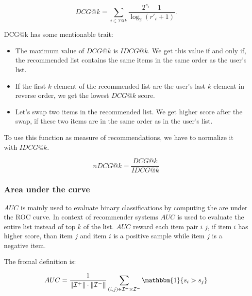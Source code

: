 $$ DCG@k=\sum_{i \in \mathcal{I}@k}\frac{2^{s_i}-1}{\log_2(r'_i+1)}.$$

DCG@k has some mentionable trait:
\begin{itemize}
\item The maximum value of $DCG@k$ is $IDCG@k$. We get this value if and only if, the
  recommended list contains the same items in the same order as the user's list.
\item If the first $k$ element of the recommended list are the user's last $k$ element in
  reverse order, we get the lowest $DCG@k$ score.
\item Let's swap two items in the recommended list. We get higher score after the
  swap, if these two items are in the same order as in the user's list.
\end{itemize}
To use this function as measure of recommendations, we have to normalize it with
$IDCG@k$.

$$nDCG@k=\frac{DCG@k}{IDCG@k}$$

\subsubsection{Area under the curve}
$AUC$ is mainly used to evaluate binary classifications by computing the are under
the ROC curve. In context of recommender systems $AUC$ is used to evaluate the
entire list instead of top $k$ of the list. $AUC$ reward each item pair $i$ $j$, if
item $i$ has higher score, than item $j$ and item $i$ is a positive sample while item
$j$ is a negative item.

The fromal definition is:

\[ AUC=\frac{1}{\|\mathcal{I}^{+}\|\cdot\|\mathcal{I}^-\|}
\sum_{(i,j)\in\mathcal{I}^+\times\mathcal{I}^-}\mathbbm{1} \{s_i > s_j \} \]



